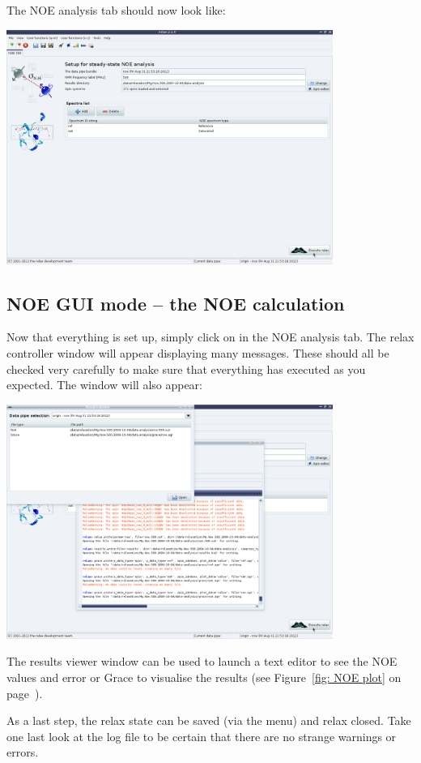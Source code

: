 The NOE analysis tab should now look like:

\begin{minipage}[h]{\linewidth}
\centerline{\includegraphics[width=0.8\textwidth, bb=14 14 1415 1019]{graphics/screenshots/noe_analysis/analysis_tab2}}
\end{minipage}



\subsection{NOE GUI mode -- the NOE calculation}

Now that everything is set up, simply click on  in the NOE analysis tab.
The relax controller window will appear displaying many messages.
These should all be checked very carefully to make sure that everything has executed as you expected.
The  window will also appear:

\begin{minipage}[h]{\linewidth}
\centerline{\includegraphics[width=0.8\textwidth, bb=14 14 1415 1019]{graphics/screenshots/noe_analysis/fin}}
\end{minipage}

The results viewer window can be used to launch a text editor to see the NOE values and error or Grace to visualise the results (see Figure~\ref{fig: NOE plot} on page~\pageref{fig: NOE plot}).

As a last step, the relax state can be saved (via the  menu) and relax closed.
Take one last look at the  log file to be certain that there are no strange warnings or errors.
